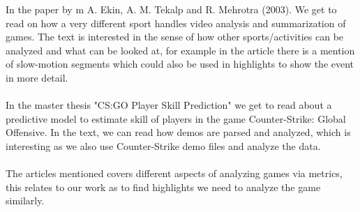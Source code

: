 In the paper  \cite{Ekin2003} by m A. Ekin, A. M. Tekalp and R. Mehrotra (2003). We get to read on how a very different sport handles video analysis and summarization of games. The text is interested in the sense of how other sports/activities can be analyzed and what can be looked at, for example in the article there is a mention of slow-motion segments which could also be used in highlights to show the event in more detail.
\\\\
In the master thesis "CS:GO Player Skill Prediction" \cite{BaranNama} we get to read about a predictive model to estimate skill of players in the game Counter-Strike: Global Offensive. In the text, we can read how demos are parsed and analyzed, which is interesting as we also use Counter-Strike demo files and analyze the data. 
\\\\
The articles mentioned covers different aspects of analyzing games via metrics, this relates to our work as to find highlights we need to analyze the game similarly. 